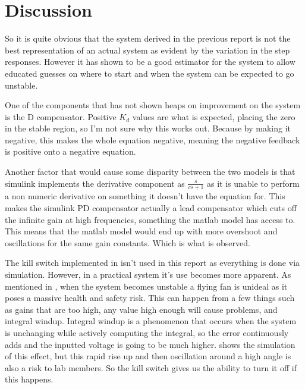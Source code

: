 \documentclass[a4paper, 11pt, compsoc]{IEEEtran}
\begin{document}
	\section{Discussion}\label{sec:disc}
		So it is quite obvious that the system derived in the previous report is not the best representation of an actual system as evident by the variation in the step responses. However it has shown to be a good estimator for the system to allow educated guesses on where to start and when the system can be expected to go unstable.
		\par
		One of the components that has not shown heaps on improvement on the system is the D compensator. Positive $K_d$ values are what is expected, placing the zero in the stable region, so I'm not sure why this works out. Because by making it negative, this makes the whole equation negative, meaning the negative feedback is positive onto a negative equation.
		\par
		Another factor that would cause some disparity between the two models is that simulink implements the derivative component as $\frac{s}{cs+1}$ as it is unable to perform a non numeric derivative on something it doesn't have the equation for. This makes the simulink PD compensator actually a lead compensator which cuts off the infinite gain at high frequencies, something the matlab model has access to. This means that the matlab model would end up with more overshoot and oscillations for the same gain constants. Which is what is observed. 
		\par
		The kill switch implemented in  isn't used in this report as everything is done via simulation. However, in a practical system it's use becomes more apparent. As mentioned in , when the system becomes unstable a flying fan is unideal as it poses a massive health and safety risk. This can happen from a few things such as gains that are too high, any value high enough will cause problems, and integral windup. Integral windup is a phenomenon that occurs when the system is unchanging while actively computing the integral, so the error continuously adds and the inputted voltage is going to be much higher.  shows the simulation of this effect, but this rapid rise up and then oscillation around a high angle is also a risk to lab members. So the kill switch gives us the ability to turn it off if this happens.
\end{document}
